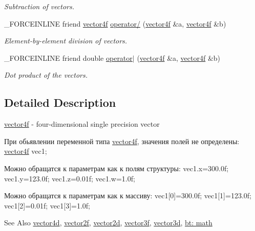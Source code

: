 \begin{DoxyCompactItemize}
\begin{DoxyCompactList}\small\item\em Subtraction of vectors. \end{DoxyCompactList}\item 
\hypertarget{classbt_1_1vector4f_a8eb7a7edb45b0fed68a2b94c64fbd7d8}{\-\_\-\-F\-O\-R\-C\-E\-I\-N\-L\-I\-N\-E friend \hyperlink{classbt_1_1vector4f}{vector4f} \hyperlink{classbt_1_1vector4f_a8eb7a7edb45b0fed68a2b94c64fbd7d8}{operator/} (\hyperlink{classbt_1_1vector4f}{vector4f} \&a, \hyperlink{classbt_1_1vector4f}{vector4f} \&b)}\label{classbt_1_1vector4f_a8eb7a7edb45b0fed68a2b94c64fbd7d8}

\begin{DoxyCompactList}\small\item\em Element-\/by-\/element division of vectors. \end{DoxyCompactList}\item 
\hypertarget{classbt_1_1vector4f_a4c43dcecc0c38d2282fead732ac94ab3}{\-\_\-\-F\-O\-R\-C\-E\-I\-N\-L\-I\-N\-E friend double \hyperlink{classbt_1_1vector4f_a4c43dcecc0c38d2282fead732ac94ab3}{operator$|$} (\hyperlink{classbt_1_1vector4f}{vector4f} \&a, \hyperlink{classbt_1_1vector4f}{vector4f} \&b)}\label{classbt_1_1vector4f_a4c43dcecc0c38d2282fead732ac94ab3}

\begin{DoxyCompactList}\small\item\em Dot product of the vectors. \end{DoxyCompactList}\end{DoxyCompactItemize}


\subsection{Detailed Description}
\hyperlink{classbt_1_1vector4f}{vector4f} -\/ four-\/dimensional single precision vector 

При обьявлении переменной типа \hyperlink{classbt_1_1vector4f}{vector4f}, значения полей не определены\-: \hyperlink{classbt_1_1vector4f}{vector4f} vec1;

Можно обращатся к параметрам как к полям структуры\-: vec1.\-x=300.\-0f; vec1.\-y=123.\-0f; vec1.\-z=0.\-01f; vec1.\-w=1.\-0f;

Можно обращатся к параметрам как к массиву\-: vec1\mbox{[}0\mbox{]}=300.\-0f; vec1\mbox{[}1\mbox{]}=123.\-0f; vec1\mbox{[}2\mbox{]}=0.\-01f; vec1\mbox{[}3\mbox{]}=1.\-0f;

\begin{DoxySeeAlso}{See Also}
\hyperlink{classbt_1_1vector4d}{vector4d}, \hyperlink{classbt_1_1vector2f}{vector2f}, \hyperlink{classbt_1_1vector2d}{vector2d}, \hyperlink{classbt_1_1vector3f}{vector3f}, \hyperlink{classbt_1_1vector3d}{vector3d}, \hyperlink{group__math}{bt\-: math} 
\end{DoxySeeAlso}


